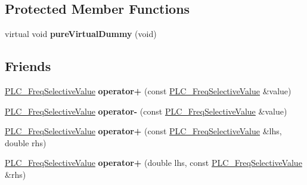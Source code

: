 \subsection*{\-Protected \-Member \-Functions}
\begin{DoxyCompactItemize}
\item 
\hypertarget{classns3_1_1PLC__FreqSelectiveValue_aa79c964bdac34394e57e1796e8fcbbd8}{virtual void {\bfseries pure\-Virtual\-Dummy} (void)}\label{classns3_1_1PLC__FreqSelectiveValue_aa79c964bdac34394e57e1796e8fcbbd8}

\end{DoxyCompactItemize}
\subsection*{\-Friends}
\begin{DoxyCompactItemize}
\item 
\hypertarget{classns3_1_1PLC__FreqSelectiveValue_ad5c6493d7db869cd9fe57030af23e55a}{\hyperlink{classns3_1_1PLC__FreqSelectiveValue}{\-P\-L\-C\-\_\-\-Freq\-Selective\-Value} {\bfseries operator+} (const \hyperlink{classns3_1_1PLC__FreqSelectiveValue}{\-P\-L\-C\-\_\-\-Freq\-Selective\-Value} \&value)}\label{classns3_1_1PLC__FreqSelectiveValue_ad5c6493d7db869cd9fe57030af23e55a}

\item 
\hypertarget{classns3_1_1PLC__FreqSelectiveValue_a7666b9bb25ab1c3ca75a51aafb06a9d3}{\hyperlink{classns3_1_1PLC__FreqSelectiveValue}{\-P\-L\-C\-\_\-\-Freq\-Selective\-Value} {\bfseries operator-\/} (const \hyperlink{classns3_1_1PLC__FreqSelectiveValue}{\-P\-L\-C\-\_\-\-Freq\-Selective\-Value} \&value)}\label{classns3_1_1PLC__FreqSelectiveValue_a7666b9bb25ab1c3ca75a51aafb06a9d3}

\item 
\hypertarget{classns3_1_1PLC__FreqSelectiveValue_ad1ebcf46751305234af9864542a2d9c9}{\hyperlink{classns3_1_1PLC__FreqSelectiveValue}{\-P\-L\-C\-\_\-\-Freq\-Selective\-Value} {\bfseries operator+} (const \hyperlink{classns3_1_1PLC__FreqSelectiveValue}{\-P\-L\-C\-\_\-\-Freq\-Selective\-Value} \&lhs, double rhs)}\label{classns3_1_1PLC__FreqSelectiveValue_ad1ebcf46751305234af9864542a2d9c9}

\item 
\hypertarget{classns3_1_1PLC__FreqSelectiveValue_a81cd52d9418c80533c4591858fe73c4f}{\hyperlink{classns3_1_1PLC__FreqSelectiveValue}{\-P\-L\-C\-\_\-\-Freq\-Selective\-Value} {\bfseries operator+} (double lhs, const \hyperlink{classns3_1_1PLC__FreqSelectiveValue}{\-P\-L\-C\-\_\-\-Freq\-Selective\-Value} \&rhs)}\label{classns3_1_1PLC__FreqSelectiveValue_a81cd52d9418c80533c4591858fe73c4f}


\end{DoxyCompactItemize}
